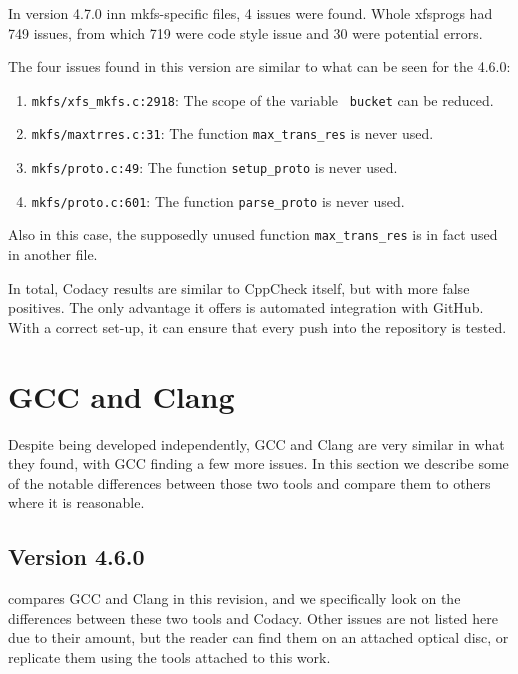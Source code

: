 In version 4.7.0 inn mkfs-specific files, 4 issues were found. Whole
xfsprogs had 749 issues, from which 719 were code style issue and 30 were
potential errors.

The four issues found in this version are similar to what can be seen for the 4.6.0:
\begin{enumerate}
	\item {\tt mkfs/xfs\_mkfs.c:2918}: The scope of the variable {\tt
		bucket} can be reduced.
	\item {\tt mkfs/maxtrres.c:31}: The function {\tt max\_trans\_res}
		is never used.
	\item {\tt mkfs/proto.c:49}: The function {\tt setup\_proto} is
		never used.
	\item {\tt mkfs/proto.c:601}: The function {\tt parse\_proto} is
		never used.
\end{enumerate}

Also in this case, the supposedly unused function {\tt max\_trans\_res} is
in fact used in another file.

In total, Codacy results are similar to CppCheck itself, but with more false
positives. The only advantage it offers is automated integration with GitHub.
With a correct set-up, it can ensure that every push into the repository is
tested.

\section{GCC and Clang}\label{chap:results:gcc}

Despite being developed independently, GCC and Clang are very similar in what
they found, with GCC finding a few more issues. In this section we describe
some of the notable differences between those two tools and compare them to
others where it is reasonable.

\subsection{Version 4.6.0}\label{chap:results:gcc:4.6}

 compares GCC and Clang in this revision, and we
specifically look on the differences between these two tools and Codacy.
Other issues are not listed here due to their amount, but the reader can find
them on an attached optical disc, or replicate them using the tools attached to
this work.

